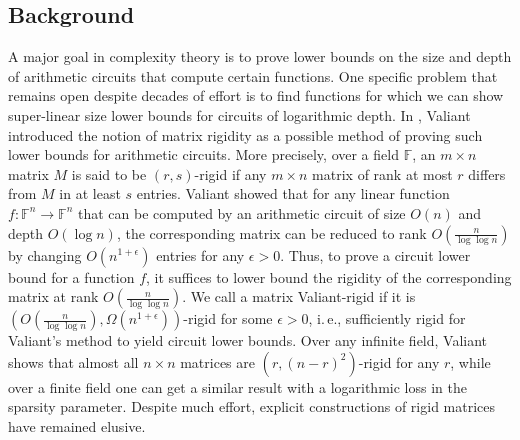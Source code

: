 \documentclass[11pt]{article}
\numberwithin{equation}{section}
\theoremstyle{definition}
\theoremstyle{plain}
\newcommand{\ie}{i.\,e.}
\theoremstyle{definition}
\newcommand\F{{\mathbb{F}}}
\begin{document}
\subsection{Background}
A major goal in complexity theory is to prove lower bounds on the size and depth of arithmetic circuits that compute certain functions.  One specific problem that remains open despite decades of effort is to find functions for which we can show super-linear size lower bounds for circuits of logarithmic depth.  In \cite{rigidity}, Valiant introduced the notion of matrix rigidity as a possible method of proving such lower bounds for arithmetic circuits.  More precisely, over a field $\F$, an $m \times n$ matrix $M$  is said to be $(r,s)$-rigid if any $m \times n$ matrix of rank at most $r$ differs from $M$ in at least $s$ entries.  Valiant showed that for any linear function $f:\F^n \rightarrow \F^n$ that can be computed by an arithmetic circuit of size $O(n)$ and depth $O(\log n)$, the corresponding matrix can be reduced to rank $O(\frac{n}{\log \log n})$ by changing $O(n^{1+\epsilon})$ entries for any $\epsilon > 0$.  Thus, to prove a circuit lower bound for a function $f$, it suffices to lower bound the rigidity of the corresponding matrix at rank $O(\frac{n}{\log \log n})$.  We call a matrix Valiant-rigid if it is 
%
$\left( O(\frac{n}{\log \log n}), \Omega(n^{1+\epsilon}) \right)$-rigid
%
%
%
%
%
for some $\epsilon > 0$, \ie, sufficiently rigid for Valiant's method to yield circuit lower bounds. Over any infinite field, Valiant shows that almost all $n \times n$ matrices are $(r, (n-r)^2)$-rigid for any $r$, while over a finite field one can get a similar result with a logarithmic loss in the sparsity parameter.  Despite much effort,
explicit constructions of rigid matrices have remained elusive.  
\end{document}
